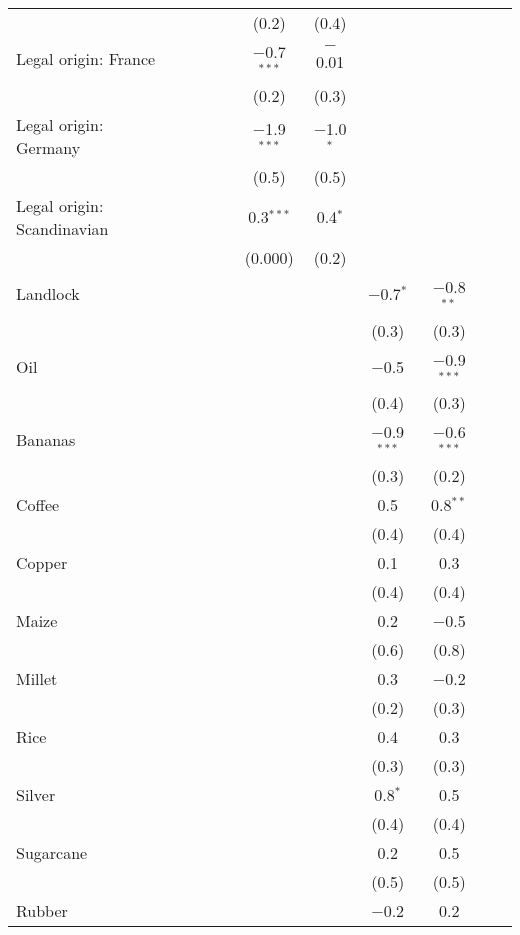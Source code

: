 {\begin{table}[]
\begin{threeparttable}
\begin{tabular}{@{\extracolsep{0pt}}lcccccccccc}
  &  &  &  &  & (0.2) & (0.4) &  &  &  &  \\ 
  Legal origin: France &  &  &  &  & $-$0.7$^{***}$ & $-$0.01 &  &  &  &  \\ 
  &  &  &  &  & (0.2) & (0.3) &  &  &  &  \\ 
  Legal origin: Germany &  &  &  &  & $-$1.9$^{***}$ & $-$1.0$^{*}$ &  &  &  &  \\ 
  &  &  &  &  & (0.5) & (0.5) &  &  &  &  \\ 
  Legal origin: Scandinavian &  &  &  &  & 0.3$^{***}$ & 0.4$^{*}$ &  &  &  &  \\ 
  &  &  &  &  & (0.000) & (0.2) &  &  &  &  \\ 
  Landlock &  &  &  &  &  &  & $-$0.7$^{*}$ & $-$0.8$^{**}$ &  &  \\ 
  &  &  &  &  &  &  & (0.3) & (0.3) &  &  \\ 
  Oil &  &  &  &  &  &  & $-$0.5 & $-$0.9$^{***}$ &  &  \\ 
  &  &  &  &  &  &  & (0.4) & (0.3) &  &  \\ 
  Bananas &  &  &  &  &  &  & $-$0.9$^{***}$ & $-$0.6$^{***}$ &  &  \\ 
  &  &  &  &  &  &  & (0.3) & (0.2) &  &  \\ 
  Coffee &  &  &  &  &  &  & 0.5 & 0.8$^{**}$ &  &  \\ 
  &  &  &  &  &  &  & (0.4) & (0.4) &  &  \\ 
  Copper &  &  &  &  &  &  & 0.1 & 0.3 &  &  \\ 
  &  &  &  &  &  &  & (0.4) & (0.4) &  &  \\ 
  Maize &  &  &  &  &  &  & 0.2 & $-$0.5 &  &  \\ 
  &  &  &  &  &  &  & (0.6) & (0.8) &  &  \\ 
  Millet &  &  &  &  &  &  & 0.3 & $-$0.2 &  &  \\ 
  &  &  &  &  &  &  & (0.2) & (0.3) &  &  \\ 
  Rice &  &  &  &  &  &  & 0.4 & 0.3 &  &  \\ 
  &  &  &  &  &  &  & (0.3) & (0.3) &  &  \\ 
  Silver &  &  &  &  &  &  & 0.8$^{*}$ & 0.5 &  &  \\ 
  &  &  &  &  &  &  & (0.4) & (0.4) &  &  \\ 
  Sugarcane &  &  &  &  &  &  & 0.2 & 0.5 &  &  \\ 
  &  &  &  &  &  &  & (0.5) & (0.5) &  &  \\ 
  Rubber &  &  &  &  &  &  & $-$0.2 & 0.2 &  &  \\ 

\end{tabular}
\end{threeparttable}
\end{table}}
